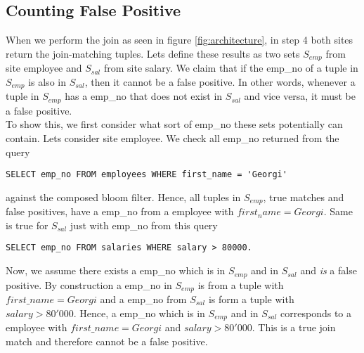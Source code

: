 \documentclass[12]{scrartcl}
\begin{document}
\subsection{Counting False Positive}
When we perform the join as seen in figure \ref{fig:architecture}, in step 4 both sites return the join-matching tuples. Lets define these results as two sets $S_{emp}$ from site employee and $S_{sal}$ from site salary. We claim that if the emp\_no of a tuple in $S_{emp}$ is also in $S_{sal}$, then it cannot be a false positive. In other words, whenever a tuple in $S_{emp}$ has a emp\_no that does not exist in $S_{sal}$ and vice versa, it must be a false positive. \\
To show this, we first consider what sort of emp\_no these sets potentially can contain. Lets consider site employee. We check all emp\_no returned from the query
\begin{verbatim}
SELECT emp_no FROM employees WHERE first_name = 'Georgi'
\end{verbatim}
against the composed bloom filter. Hence, all tuples in $S_{emp}$, true matches and false positives, have a emp\_no from a employee with $first_name = Georgi$. Same is true for $S_{sal}$ just with emp\_no from this query 
\begin{verbatim}
SELECT emp_no FROM salaries WHERE salary > 80000.
\end{verbatim}
Now, we assume there exists a emp\_no which is in $S_{emp}$ and in $S_{sal}$ and \emph{is} a false positive. By construction a emp\_no in $S_{emp}$ is from a tuple with $first\_name = Georgi$ and a emp\_no from $S_{sal}$ is form a tuple with $salary > 80'000$. Hence, a emp\_no which is in $S_{emp}$ and in $S_{sal}$ corresponds to a employee with $first\_name = Georgi$ and $salary > 80'000$. This is a true join match and therefore cannot be a false positive.
\end{document}
